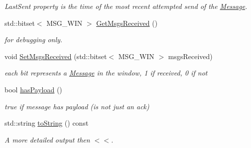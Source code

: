 \begin{DoxyCompactItemize}
\begin{DoxyCompactList}\small\item\em LastSent property is the time of the most recent attempted send of the \hyperlink{classPseudoTcp_1_1Message}{Message}. \item\end{DoxyCompactList}\item 
std::bitset$<$ MSG\_\-WIN $>$ \hyperlink{group__group1_gaa74cf86697d336a90508f375067e02ef}{GetMsgsReceived} ()
\begin{DoxyCompactList}\small\item\em for debugging only. \item\end{DoxyCompactList}\item 
\hypertarget{group__group1_gaaf86c7594534b605b19a0f7843c02e93}{
void \hyperlink{group__group1_gaaf86c7594534b605b19a0f7843c02e93}{SetMsgsReceived} (std::bitset$<$ MSG\_\-WIN $>$ msgsReceived)}
\label{group__group1_gaaf86c7594534b605b19a0f7843c02e93}

\begin{DoxyCompactList}\small\item\em each bit represents a \hyperlink{classPseudoTcp_1_1Message}{Message} in the window, 1 if received, 0 if not \item\end{DoxyCompactList}\item 
\hypertarget{classPseudoTcp_1_1Message_a594bb615fbd8a2b617ee0123b8b0f731}{
bool \hyperlink{classPseudoTcp_1_1Message_a594bb615fbd8a2b617ee0123b8b0f731}{hasPayload} ()}
\label{classPseudoTcp_1_1Message_a594bb615fbd8a2b617ee0123b8b0f731}

\begin{DoxyCompactList}\small\item\em true if message has payload (is not just an ack) \item\end{DoxyCompactList}\item 
\hypertarget{classPseudoTcp_1_1Message_ac73b3655ae61e6140019d819383c594e}{
std::string \hyperlink{classPseudoTcp_1_1Message_ac73b3655ae61e6140019d819383c594e}{toString} () const }
\label{classPseudoTcp_1_1Message_ac73b3655ae61e6140019d819383c594e}

\begin{DoxyCompactList}\small\item\em A more detailed output then $<$$<$. \item\end{DoxyCompactList}\end{DoxyCompactItemize}

